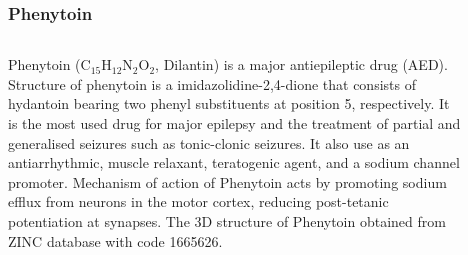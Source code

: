 \frametitle{Phenytoin}
\begin{columns}
\begin{column}{0.6\linewidth}
	Phenytoin (C$_{15}$H$_{12}$N$_{2}$O$_{2}$, Dilantin) is a major antiepileptic drug (AED).
	Structure of phenytoin is a imidazolidine-2,4-dione that consists of hydantoin bearing two phenyl substituents at position 5, respectively.
	It is the most used drug for major epilepsy and the treatment of partial and generalised seizures such as tonic-clonic seizures.
	It also use as an antiarrhythmic, muscle relaxant, teratogenic agent, and a sodium channel promoter.
	Mechanism of action of Phenytoin acts by promoting sodium efflux from neurons in the motor cortex, reducing post-tetanic potentiation at synapses.
	The 3D structure of Phenytoin obtained from ZINC database with code 1665626.
\end{column}
\begin{column}{0.4\linewidth}
	\begin{figure}
		\texttt{[image: phenytoin\_str.png]}
		\caption{\centering The structure of Phenytoin.}
		\label{fig:pht_str}
	\end{figure}
\end{column}
\end{columns}